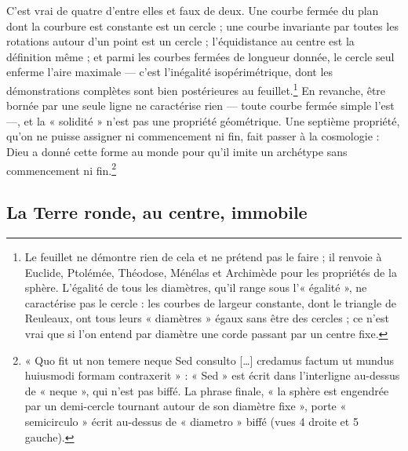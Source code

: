 \documentclass[11pt,a4paper]{article}
\begin{document}
C'est vrai de quatre d'entre elles et faux de deux. Une courbe fermée du plan
dont la courbure est constante est un cercle ; une courbe invariante par toutes
les rotations autour d'un point est un cercle ; l'équidistance au centre est la
définition même ; et parmi les courbes fermées de longueur donnée, le cercle
seul enferme l'aire maximale — c'est l'inégalité isopérimétrique, dont les
démonstrations complètes sont bien postérieures au feuillet.\footnote{Le
feuillet ne démontre rien de cela et ne prétend pas le faire ; il renvoie à
Euclide, Ptolémée, Théodose, Ménélas et Archimède pour les propriétés de la
sphère. L'égalité de tous les diamètres, qu'il range sous l'« égalité », ne
caractérise pas le cercle : les courbes de largeur constante, dont le triangle
de Reuleaux, ont tous leurs « diamètres » égaux sans être des cercles ; ce
n'est vrai que si l'on entend par diamètre une corde passant par un centre
fixe.} En revanche, être bornée par une seule ligne ne caractérise rien — toute
courbe fermée simple l'est —, et la « solidité » n'est pas une propriété
géométrique. Une septième propriété, qu'on ne puisse assigner ni commencement
ni fin, fait passer à la cosmologie : Dieu a donné cette forme au monde pour
qu'il imite un archétype sans commencement ni fin.\footnote{« Quo fit ut non
temere neque Sed consulto […] credamus factum ut mundus huiusmodi formam
contraxerit » : « Sed » est écrit dans l'interligne au-dessus de « neque », qui
n'est pas biffé. La phrase finale, « la sphère est engendrée par un demi-cercle
tournant autour de son diamètre fixe », porte « semicirculo » écrit au-dessus
de « diametro » biffé (vues 4 droite et 5 gauche).}

\subsection*{La Terre ronde, au centre, immobile}
\end{document}
